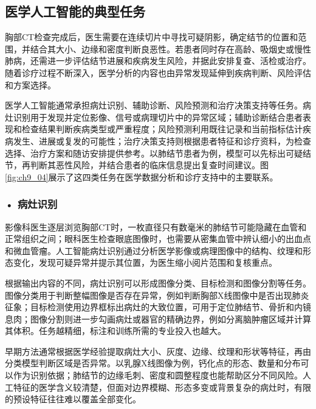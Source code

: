 \subsection{医学人工智能的典型任务}

胸部CT检查完成后，医生需要在连续切片中寻找可疑阴影，确定结节的位置和范围，并结合其大小、边缘和密度判断良恶性。若患者同时存在高龄、吸烟史或慢性肺病，还需进一步评估结节进展和疾病发生风险，并据此安排复查、活检或治疗。随着诊疗过程不断深入，医学分析的内容也由异常发现延伸到疾病判断、风险评估和方案选择。

医学人工智能通常承担病灶识别、辅助诊断、风险预测和治疗决策支持等任务。病灶识别用于发现并定位影像、信号或病理切片中的异常区域；辅助诊断结合患者表现和检查结果判断疾病类型或严重程度；风险预测利用既往记录和当前指标估计疾病发生、进展或复发的可能性；治疗决策支持则根据患者特征和诊疗资料，为检查选择、治疗方案和随访安排提供参考。以肺结节患者为例，模型可以先标出可疑结节，再判断其恶性风险，并结合患者的临床信息提出复查时间建议。图\ref{fig:ch9_04}展示了这四类任务在医学数据分析和诊疗支持中的主要联系。


\par
\noindent\begin{minipage}{\textwidth}
\centering
{}
\label{fig:ch9_04}
\end{minipage}
\par

\subsubsection*{\textbf{• 病灶识别}}

影像科医生逐层浏览胸部CT时，一枚直径只有数毫米的肺结节可能隐藏在血管和正常组织之间；眼科医生检查眼底图像时，也需要从密集血管中辨认细小的出血点和微血管瘤。人工智能病灶识别通过分析医学影像或病理图像中的结构、纹理和形态变化，发现可疑异常并提示其位置，为医生缩小阅片范围和复核重点。

根据输出内容的不同，病灶识别可以形成图像分类、目标检测和图像分割等任务。图像分类用于判断整幅图像是否存在异常，例如判断胸部X线图像中是否出现肺炎征象；目标检测使用边界框标出病灶的大致位置，可用于定位肺结节、骨折和内镜息肉；图像分割则进一步勾画病灶或器官的精确边界，例如分离脑肿瘤区域并计算其体积。任务越精细，标注和训练所需的专业投入也越大。

早期方法通常根据医学经验提取病灶大小、灰度、边缘、纹理和形状等特征，再由分类模型判断区域是否异常。以乳腺X线图像为例，钙化点的形态、数量和分布可以作为识别依据；肺结节的边缘毛刺、密度和圆整程度也能帮助区分不同风险。人工特征的医学含义较清楚，但面对边界模糊、形态多变或背景复杂的病灶时，有限的预设特征往往难以覆盖全部变化。

